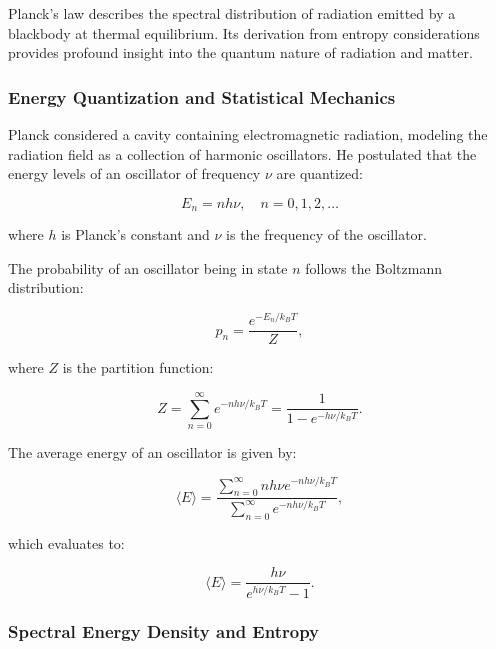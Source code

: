 \documentclass[a4paper,10pt]{article}
\begin{document}
Planck's law describes the spectral distribution of radiation emitted by a blackbody at thermal equilibrium. Its derivation from entropy considerations provides profound insight into the quantum nature of radiation and matter.

\subsubsection*{Energy Quantization and Statistical Mechanics}

Planck considered a cavity containing electromagnetic radiation, modeling the radiation field as a collection of harmonic oscillators. He postulated that the energy levels of an oscillator of frequency $\nu$ are quantized:

\begin{equation*}
    E_n = n h \nu, \quad n = 0,1,2, \dots
\end{equation*}

where $h$ is Planck's constant and $\nu$ is the frequency of the oscillator.

The probability of an oscillator being in state $n$ follows the Boltzmann distribution:

\begin{equation*}
    p_n = \frac{e^{-E_n / k_B T}}{Z},
\end{equation*}

where $Z$ is the partition function:

\begin{equation*}
    Z = \sum_{n=0}^{\infty} e^{-n h \nu / k_B T} = \frac{1}{1 - e^{-h \nu / k_B T}}.
\end{equation*}

The average energy of an oscillator is given by:

\begin{equation*}
    \langle E \rangle = \frac{\sum_{n=0}^{\infty} n h \nu e^{-n h \nu / k_B T}}{\sum_{n=0}^{\infty} e^{-n h \nu / k_B T}},
\end{equation*}

which evaluates to:

\begin{equation*}
    \langle E \rangle = \frac{h \nu}{e^{h \nu / k_B T} - 1}.
\end{equation*}

\subsubsection*{Spectral Energy Density and Entropy}
\end{document}
